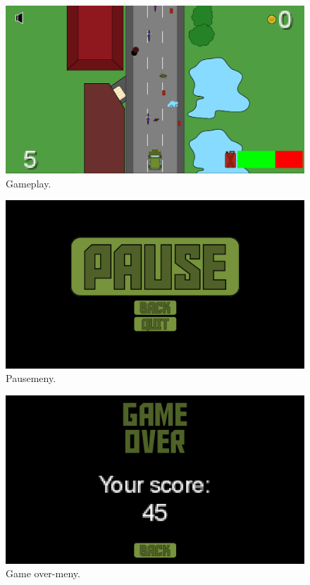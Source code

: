 \documentclass[paper=a4]{article}
\begin{document}
	\begin{figure}\begin{center}
		\includegraphics[width=1.00\textwidth]{images/game.PNG}
		\caption{Gameplay.}
	\end{center}\end{figure}

	\begin{figure}\begin{center}
		\includegraphics[width=1.00\textwidth]{images/pause.PNG}
		\caption{Pausemeny.}
	\end{center}\end{figure}

	\begin{figure}\begin{center}
		\includegraphics[width=1.00\textwidth]{images/gameover.PNG}
		\caption{Game over-meny.}
	\end{center}\end{figure}
\end{document}
